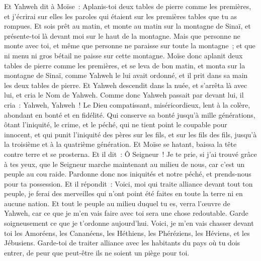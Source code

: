 \begin{multicols}{2}
\VerseOne{}Et Yahweh dit à Moïse~: Aplanis-toi deux tables de pierre comme les premières, et j'écrirai sur elles les paroles qui étaient sur les premières tables que tu as rompues.
Et sois prêt au matin, et monte au matin sur la montagne de Sinaï, et présente-toi là devant moi sur le haut de la montagne.
Mais que personne ne monte avec toi, et même que personne ne paraisse sur toute la montagne~; et que ni menu ni gros bétail ne paisse sur cette montagne.
Moïse donc aplanit deux tables de pierre comme les premières, et se leva de bon matin, et monta sur la montagne de Sinaï, comme Yahweh le lui avait ordonné, et il prit dans sa main les deux tables de pierre.
Et Yahweh descendit dans la nuée, et s'arrêta là avec lui, et cria le Nom de Yahweh.
Comme donc Yahweh passait par devant lui, il cria~: Yahweh, Yahweh~! Le Dieu compatissant, miséricordieux, lent à la colère, abondant en bonté et en fidélité.
Qui conserve sa bonté jusqu'à mille générations, ôtant l'iniquité, le crime, et le péché, qui ne tient point le coupable pour innocent, et qui punit l'iniquité des pères sur les fils, et sur les fils des fils, jusqu'à la troisième et à la quatrième génération.
Et Moïse se hatant, baissa la tête contre terre et se prosterna. 
Et il dit~: Ô Seigneur~! Je te prie, si j'ai trouvé grâce à tes yeux, que le Seigneur marche maintenant au milieu de nous, car c'est un peuple au cou raide. Pardonne donc nos iniquités et notre péché, et prends-nous pour ta possession.
Et il répondit~: Voici, moi qui traite alliance devant tout ton peuple, je ferai des merveilles qui n'ont point été faites en toute la terre ni en aucune nation. Et tout le peuple au milieu duquel tu es, verra l'œuvre de Yahweh, car ce que je m'en vais faire avec toi sera une chose redoutable.
Garde soigneusement ce que je t'ordonne aujourd'hui. Voici, je m'en vais chasser devant toi les Amoréens, les Cananéens, les Héthiens, les Phéréziens, les Héviens, et les Jébusiens.
Garde-toi de traiter alliance avec les habitants du pays où tu dois entrer, de peur que peut-être ils ne soient un piège pour toi.

\end{multicols}
